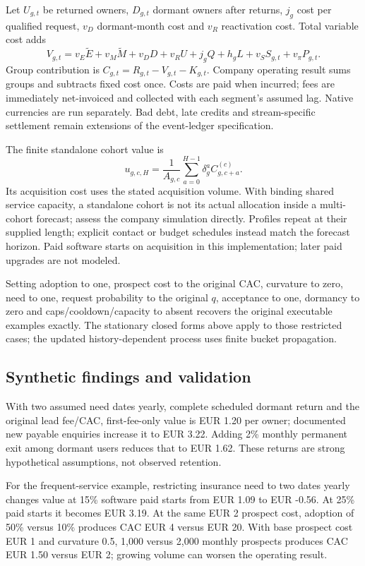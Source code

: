 \documentclass[11pt,a4paper]{article}
\begin{document}
Let $U_{g,t}$ be returned owners, $D_{g,t}$ dormant owners after returns, $j_g$ cost per qualified request, $v_D$ dormant-month cost and $v_R$ reactivation cost. Total variable cost adds
\begin{equation}
 V_{g,t}=v_E\widetilde E+v_M\widetilde M+v_DD+v_RU+j_gQ+h_gL
                 +v_SS_{g,t}+v_\pi P_{g,t}.
\end{equation}
Group contribution is $C_{g,t}=R_{g,t}-V_{g,t}-K_{g,t}$. Company operating result sums groups and subtracts fixed cost once. Costs are paid when incurred; fees are immediately net-invoiced and collected with each segment's assumed lag. Native currencies are run separately. Bad debt, late credits and stream-specific settlement remain extensions of the event-ledger specification.

The finite standalone cohort value is
\begin{equation}
 u_{g,c,H}=\frac{1}{A_{g,c}}\sum_{a=0}^{H-1}\delta_g^a C_{g,c+a}^{(c)}.
\end{equation}
Its acquisition cost uses the stated acquisition volume. With binding shared service capacity, a standalone cohort is not its actual allocation inside a multi-cohort forecast; assess the company simulation directly. Profiles repeat at their supplied length; explicit contact or budget schedules instead match the forecast horizon. Paid software starts on acquisition in this implementation; later paid upgrades are not modeled.

Setting adoption to one, prospect cost to the original CAC, curvature to zero, need to one, request probability to the original $q$, acceptance to one, dormancy to zero and caps/cooldown/capacity to absent recovers the original executable examples exactly. The stationary closed forms above apply to those restricted cases; the updated history-dependent process uses finite bucket propagation.

\subsection{Synthetic findings and validation}
With two assumed need dates yearly, complete scheduled dormant return and the original lead fee/CAC, first-fee-only value is EUR 1.20 per owner; documented new payable enquiries increase it to EUR 3.22. Adding 2\% monthly permanent exit among dormant users reduces that to EUR 1.62. These returns are strong hypothetical assumptions, not observed retention.

For the frequent-service example, restricting insurance need to two dates yearly changes value at 15\% software paid starts from EUR 1.09 to EUR -0.56. At 25\% paid starts it becomes EUR 3.19. At the same EUR 2 prospect cost, adoption of 50\% versus 10\% produces CAC EUR 4 versus EUR 20. With base prospect cost EUR 1 and curvature 0.5, 1,000 versus 2,000 monthly prospects produces CAC EUR 1.50 versus EUR 2; growing volume can worsen the operating result.
\end{document}
